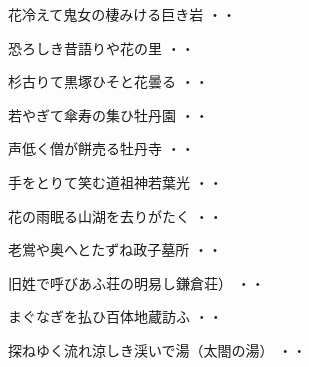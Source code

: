 \begin{shiika}花冷えて鬼女の棲みける巨き岩
\hfill{・・}\end{shiika}
\vspace{0.6cm}
\begin{shiika}恐ろしき昔語りや花の里
\hfill{・・}\end{shiika}
\vspace{0.6cm}
\begin{shiika}杉古りて黒塚ひそと花曇る
\hfill{・・}\end{shiika}
\vspace{0.6cm}
\begin{shiika}若やぎて傘寿の集ひ牡丹園
\hfill{・・}\end{shiika}
\vspace{0.6cm}
\begin{shiika}声低く僧が餅売る牡丹寺
\hfill{・・}\end{shiika}
\vspace{0.6cm}
\begin{shiika}手をとりて笑む道祖神若葉光
\hfill{・・}\end{shiika}
\vspace{0.6cm}
\begin{shiika}花の雨眠る山湖を去りがたく
\hfill{・・}\end{shiika}
\vspace{0.6cm}
\begin{shiika}老鴬や奥へとたずね政子墓所
\hfill{・・}\end{shiika}
\vspace{0.6cm}
\begin{shiika}旧姓で呼びあふ荘の明易し鎌倉荘）
\hfill{・・}\end{shiika}
\vspace{0.6cm}
\begin{shiika}まぐなぎを払ひ百体地蔵訪ふ
\hfill{・・}\end{shiika}
\vspace{0.6cm}
\begin{shiika}探ねゆく流れ涼しき渓いで湯（太閤の湯）
\hfill{・・}\end{shiika}
\vspace{0.6cm}
